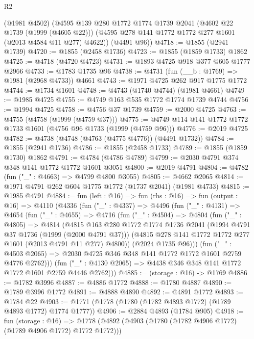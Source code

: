 \begin{lexlean}{R2}
\begin{coremodule}
      (@1981 @4502)
      (@4595
        @139
        @280
        @1772
        @1774
        @1739
        @2041
        (@4602 @22 @1739 (@1999 (@4605 @22)))
        (@4595 @278 @141 @1772 @1772 @277 @1601 (@2013 @4584 @11 @277) @4622))
      (@4491 @96))
@4718 := @1855 (@2941 @1739)
@4720 := @1855 (@2458 @1736)
@4723 := @1855 (@1859 @1733) @1862
@4725 := @4718 (@4720 @4723)
@4731 := @1893 @4725 @918 @377 @605 @1777 @2966
@4733 := @1783 @1735 @96
@4738 := @4731 (fun (__b : @1769) => @1981 (@2968 @4733)) @4661
@4743 := @1971 @4725 @262 @917 @1775 @1772
@4744 := @1734 @1601
@4748 := @4743 (@1740 @4744) (@1981 @4661)
@4749 := @1985 @4725
@4755 := @4749 @163 @535 @1772 @1774 @1739 @4744
@4756 := @1994 @4725
@4758 := @4756 @37 @1739
@4759 := @2000 @4725
@4763 := @4755 (@4758 (@1999 (@4759 @37)))
@4775 := @4749 @114 @141 @1772 @1772 @1733 @1601 (@4756 @96 @1733 (@1999 (@4759 @96)))
@4776 := @2019 @4725
@4782 := @4738 (@4748 (@4763 (@4775 @4776)) (@4491 @1732))
@4784 := @1855 (@2941 @1736)
@4786 := @1855 (@2458 @1733)
@4789 := @1855 (@1859 @1730) @1862
@4791 := @4784 (@4786 @4789)
@4799 := @2030 @4791 @374 @348 @141 @1772 @1772 @1601 @3051
@4800 := @2019 @4791
@4804 := @4782 (fun ("_" : @4663) => @4799 @4800 @3055)
@4805 := @4662 @2065
@4814 := @1971 @4791 @262 @604 @1775 @1772 (@1737 @2041) (@1981 @4733)
@4815 := @1985 @4791
@4884 := fun (left : @16) =>
  fun (rhs : @16) =>
  fun (output : @16) =>
  @4110
    (@4336
      (fun ("_" : @4337) =>
      @4496
        (fun ("_" : @4131) =>
        @4654
          (fun ("_" : @4655) =>
          @4716
            (fun ("_" : @4504) =>
            @4804
              (fun ("_" : @4805) =>
              @4814
                (@4815
                  @163
                  @280
                  @1772
                  @1774
                  @1736
                  @2041
                  (@1994 @4791 @37 @1736 (@1999 (@2000 @4791 @37)))
                  (@4815 @278 @141 @1772 @1772 @277 @1601 (@2013 @4791 @11 @277) @4800))
                (@2024 @1735 @96)))
            (fun ("_" : @4503 @2065) =>
            @2030 @4725 @346 @348 @141 @1772 @1772 @1601 @2759 @4776 @2762)))
        (fun ("_" : @4130 @2065) => @4438 @346 @348 @141 @1772 @1772 @1601 @2759 @4446 @2762)))
@4885 := (storage : @16) -> @1769
@4886 := @1782 @3996
@4887 := @4886 @1772
@4888 := @1780 @4887
@4890 := @1789 @3996 @1772
@4891 := @4888 @4890
@4892 := @4891 @1772
@4893 := @1784 @22
@4903 := @1771 (@1778 (@1780 (@1782 @4893 @1772) (@1789 @4893 @1772) @1774 @1777))
@4906 := @2884 @4893 (@1784 @905)
@4918 := fun (storage : @16) =>
  @1778 (@4892 (@4903 (@1780 (@1782 @4906 @1772) (@1789 @4906 @1772) @1772 @1772)))

\end{coremodule}
\end{lexlean}
